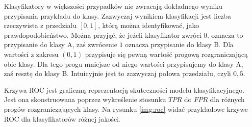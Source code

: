 \documentclass[a4paper, twoside, 11pt, openright]{article}
\begin{document}
Klasyfikatory w większości przypadków nie zwracają dokładnego wyniku przypisania przykładu do klasy. Zazwyczaj wynikiem klasyfikacji jest liczba rzeczywista z przedziału $[0, 1]$, którą można identyfikować, jako prawdopodobieństwo. Można przyjąć, że jeżeli klasyfikator zwróci $0$, oznacza to przypisanie do klasy A, zaś zwrócenie $1$ oznacza przypisanie do klasy B. Dla wartości z zakresu $(0, 1)$ przypisuje się pewną wartość progową rozgraniczającą obie klasy. Dla tego progu mniejsze od niego wartości przypisujemy do klasy A, zaś resztę do klasy B. Intuicyjnie jest to zazwyczaj połowa przedziału, czyli $0,5$.

Krzywa ROC jest graficzną reprezentacją skuteczności modelu klasyfikacyjnego. Jest ona skonstruowana poprzez wykreślenie stosunku $TPR$ do $FPR$ dla różnych progów rozgraniczających klasy. Na rysunku \ref{img:roc} widać przykładowe krzywe ROC dla klasyfikatorów różnej jakości.
\end{document}
